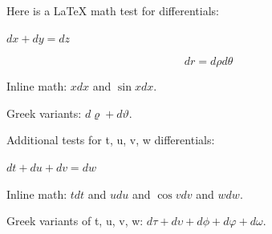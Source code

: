 \documentclass{article}
\begin{document}
Here is a LaTeX math test for differentials:

\( dx + dy = dz \)

\[ dr = d\rho d\theta \]

Inline math: $x dx$ and $\sin x dx$.

Greek variants: $d\varrho + d\vartheta$.

Additional tests for t, u, v, w differentials:

\( dt + du + dv = dw \)

Inline math: $t dt$ and $u du$ and $\cos v dv$ and $w dw$.

Greek variants of t, u, v, w: $d\tau + d\upsilon + d\phi + d\varphi + d\omega$.
\end{document}
